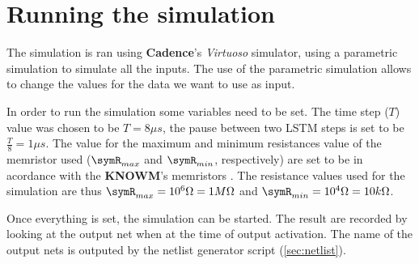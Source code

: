 \section{Running the simulation}\label{sec:run}

The simulation is ran using \textbf{Cadence}'s \textit{Virtuoso} simulator, using a parametric simulation to simulate all the inputs. The use of the parametric simulation allows to change the values for the data we want to use as input.

In order to run the simulation some variables need to be set. The time step ($T$) value was chosen to be $T=8\mu s$, the pause between two \ac{LSTM} steps is set to be $\frac{T}{8}=1\mu s$. The value for the maximum and minimum resistances value of the memristor used ($\symR_{max}$ and $\symR_{min}$, respectively) are set to be in acordance with the \textbf{KNOWM}\textregistered{}'s memristors \cite{Knowm}. The resistance values used for the simulation are thus $\symR_{max}=10^6 \Omega=1M\Omega$ and $\symR_{min}=10^4 \Omega = 10k\Omega$.

Once everything is set, the simulation can be started. The result are recorded by looking at the output net when at the time of output activation. The name of the output nets is outputed by the netlist generator script (\cref{sec:netlist}).

